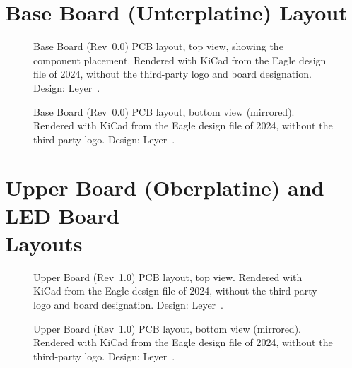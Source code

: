 \clearpage

\section{Base Board (Unterplatine) Layout}
\label{sec:app_base_board_schematics}

\begin{figure}[H]
	\centering
	\caption[Base Board Layout (Top)]{Base Board (Rev~0.0) PCB layout, top view, showing the component placement. Rendered with KiCad from the Eagle design file of 2024, without the third-party logo and board designation. Design: Leyer~\cite{leyer2023}.}
	\label{fig:base_layout_top}
\end{figure}

\begin{figure}[H]
	\centering
	\caption[Base Board Layout (Bottom)]{Base Board (Rev~0.0) PCB layout, bottom view (mirrored). Rendered with KiCad from the Eagle design file of 2024, without the third-party logo. Design: Leyer~\cite{leyer2023}.}
	\label{fig:base_layout_bottom}
\end{figure}

\clearpage

\section[Upper Board (Oberplatine) and LED Board Layouts]{Upper Board (Oberplatine) and LED Board\\Layouts}
\label{sec:app_upper_board_schematics}

\begin{figure}[H]
	\centering
	\caption[Upper Board Layout (Top)]{Upper Board (Rev~1.0) PCB layout, top view. Rendered with KiCad from the Eagle design file of 2024, without the third-party logo and board designation. Design: Leyer~\cite{leyer2023}.}
	\label{fig:upper_layout_top}
\end{figure}

\begin{figure}[H]
	\centering
	\caption[Upper Board Layout (Bottom)]{Upper Board (Rev~1.0) PCB layout, bottom view (mirrored). Rendered with KiCad from the Eagle design file of 2024, without the third-party logo. Design: Leyer~\cite{leyer2023}.}
	\label{fig:upper_layout_bottom}
\end{figure}

